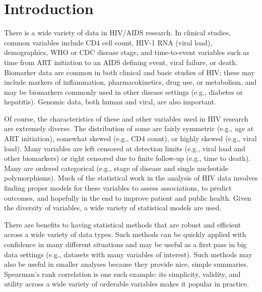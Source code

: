 \documentclass[12pt, usenatbib]{article}
\begin{document}

\setlength{\parindent}{0.5in} 
\setlength{\baselineskip}{12pt}

\bigskip 

\def\baselinestretch{1.7}\small\normalsize%




\section{Introduction}

There is a wide variety of data in HIV/AIDS research.  In clinical studies, common variables include CD4 cell count, HIV-1 RNA (viral load), demographics, WHO or CDC disease stage, and time-to-event variables such as time from ART initiation to an AIDS defining event, viral failure, or death.  Biomarker data are common in both clinical and basic studies of HIV; these may include markers of inflammation, pharmacokinetics,  drug use, or metabolism, and may be biomarkers commonly used in other disease settings (e.g., diabetes or hepatitis).  Genomic data, both human and viral, are also important.  

Of course, the characteristics of these and other variables used in HIV research are extremely diverse.  The distribution of some are fairly symmetric (e.g., age at ART initiation), somewhat skewed (e.g., CD4 count), or highly skewed (e.g., viral load). Many variables are left censored at detection limits (e.g., viral load and other biomarkers) or right censored due to finite follow-up (e.g., time to death).  Many are ordered categorical (e.g., stage of disease and single nucleotide polymorphisms).  Much of the statistical work in the analysis of HIV data involves finding proper models for these variables to assess associations, to predict outcomes, and hopefully in the end to improve patient and public health. Given the diversity of variables, a wide variety of statistical models are used.

There are benefits to having statistical methods that are robust and efficient across a wide variety of data types.  Such methods can be quickly applied with confidence in many different situations and may be useful as a first pass in big data settings (e.g., datasets with many variables of interest).  Such methods may also be useful in smaller analyses because they provide nice, simple summaries.  Spearman's rank correlation is one such example: its simplicity, validity, and utility across a wide variety of orderable variables makes it popular in practice.  
\end{document}
